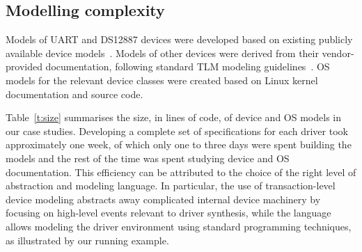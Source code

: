 \subsection{Modelling complexity} 
Models of UART and DS12887 devices were developed based on existing publicly available device models~\cite{ds12887, uart}.  Models of other devices were derived from their vendor-provided documentation, following standard TLM modeling guidelines~\cite{dml_ug}.  OS models for the relevant device classes were created based on Linux kernel documentation and source code.  

Table~\ref{t:size} summarises the size, in lines of code, of device and OS models in our case studies.  Developing a complete set of specifications for each driver took approximately one week, of which only one to three days were spent building the models and the rest of the time was spent studying device and OS documentation.  This efficiency can be attributed to the choice of the right level of abstraction and modeling language.  In particular, the use of transaction-level device modeling abstracts away complicated internal device machinery by focusing on high-level events relevant to driver synthesis, while the \tsl language allows modeling the driver environment using standard programming techniques, as illustrated by our running example.

